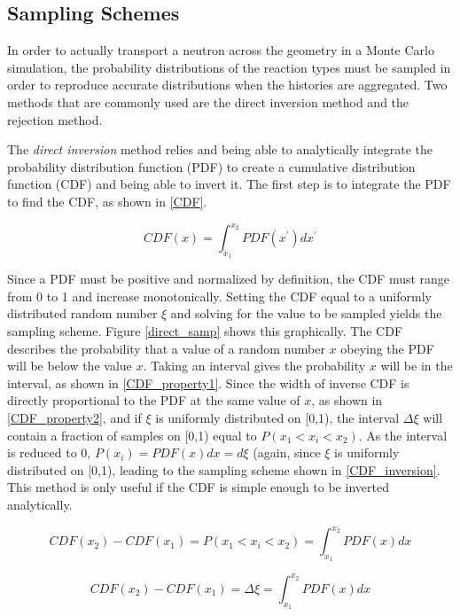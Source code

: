 \subsection{Sampling Schemes}

In order to actually transport a neutron across the geometry in a Monte Carlo simulation, the probability distributions of the reaction types must be sampled in order to reproduce accurate distributions when the histories are aggregated.  Two methods that are commonly used are the direct inversion method and the rejection method.  

The \emph{direct inversion} method relies and being able to analytically integrate the probability distribution function (PDF) to create a cumulative distribution function (CDF) and being able to invert it.  The first step is to integrate the PDF to find the CDF, as shown in \eqref{CDF}.

\begin{equation}
\label{CDF}
CDF(x) = \int_{x_1}^{x_2} PDF(x^\prime) dx^\prime
\end{equation}

Since a PDF must be positive and normalized by definition, the CDF must range from 0 to 1 and increase monotonically.  Setting the CDF equal to a uniformly distributed random number $\xi$ and solving for the value to be sampled yields the sampling scheme.  Figure \ref{direct_samp} shows this graphically.  The CDF describes the probability that a value of a random number $x$ obeying the PDF will be below the value $x$.  Taking an interval gives the probability $x$ will be in the interval, as shown in \eqref{CDF_property1}.  Since the width of inverse CDF is directly proportional to the PDF at the same value of $x$, as shown in \eqref{CDF_property2}, and if $\xi$ is uniformly distributed on [0,1), the interval $\Delta \xi$ will contain a fraction of samples on [0,1) equal to $P( x_1 < x_i < x_2)$.  As the interval is reduced to 0, $P(x_i)= PDF(x)dx = d\xi$ (again, since $\xi$ is uniformly distributed on [0,1), leading to the sampling scheme shown in \eqref{CDF_inversion}.  This method is only useful if the CDF is simple enough to be inverted analytically.

\begin{equation}
\label{CDF_property1}
CDF(x_2) - CDF(x_1) = P( x_1 < x_i < x_2) = \int_{x_1}^{x_2} PDF(x) dx
\end{equation}

\begin{equation}
\label{CDF_property2}
CDF(x_2) - CDF(x_1) = \Delta \xi =  \int_{x_1}^{x_2} PDF(x) dx
\end{equation}

